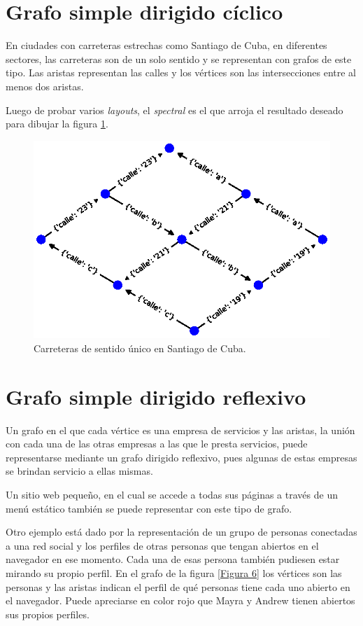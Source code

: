 \documentclass{article}
\begin{document}
\section{Grafo simple dirigido cíclico}

En ciudades con carreteras estrechas como Santiago de Cuba, en diferentes sectores, las carreteras son de un solo sentido y se representan con grafos de este tipo. Las aristas representan las calles y los vértices son las intersecciones entre al menos dos aristas.

Luego de probar varios \textit{layouts}, el \textit{spectral} es el que arroja el resultado deseado para dibujar la figura \ref{Figura 5}.

\begin{figure}
  \includegraphics[width=.8\columnwidth]{fig5.eps}
  \vspace*{-15mm}
  \caption{Carreteras de sentido único en Santiago de Cuba.}
  \label{Figura 5}
\end{figure}




\section{Grafo simple dirigido reflexivo}

Un grafo en el que cada vértice es una empresa de servicios y las aristas, la unión con cada una de las otras empresas a las que le presta servicios, puede representarse mediante un grafo dirigido reflexivo, pues algunas de estas empresas se brindan servicio a ellas mismas. 

Un sitio web pequeño, en el cual se accede a todas sus páginas a través de un menú estático también se puede representar con este tipo de grafo. 

Otro ejemplo está dado por la representación de un grupo de personas conectadas a una red social y los perfiles de otras personas que tengan abiertos en el navegador en ese momento. Cada una de esas persona también pudiesen estar mirando su propio
perfil. En el grafo de la figura \ref{Figura 6} los vértices son las personas y las aristas indican el perfil de qué personas tiene cada uno abierto en el navegador. Puede apreciarse en color rojo que Mayra y Andrew tienen abiertos sus propios perfiles.
\end{document}
